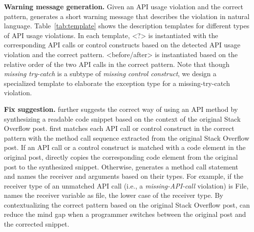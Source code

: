 
{\bf Warning message generation.} Given an API usage violation and the correct pattern, {\tool} generates a short warning message that describes the violation in natural language. Table~\ref{tab:template} shows the description templates for different types of API usage violations. In each template, {\textless?\textgreater} is instantiated with the corresponding API calls or control constructs based on the detected API usage violation and the correct pattern. {\textless before/after\textgreater} is instantiated based on the relative order of the two API calls in the correct pattern. Note that though {\em missing try-catch} is a subtype of {\em missing control construct}, we design a specialized template to elaborate the exception type for a missing-try-catch violation. 

{\bf Fix suggestion.} {\tool} further suggests the correct way of using an API method by synthesizing a readable code snippet based on the context of the original Stack Overflow post. {\tool} first matches each API call or control construct in the correct pattern with the method call sequence extracted from the original Stack Overflow post. If an API call or a control construct is matched with a code element in the original post, {\tool} directly copies the corresponding code element from the original post to the synthesized snippet. Otherwise, {\tool} generates a method call statement and names the receiver and arguments based on their types. For example, if the receiver type of an unmatched API call (i.e., a {\em missing-API-call} violation) is {\ttt File}, {\tool} names the receiver variable as {\ttt file}, the lower case of the receiver type. By contextualizing the correct pattern based on the original Stack Overflow post, {\tool} can reduce the mind gap when a programmer switches between the original post and the corrected snippet.

